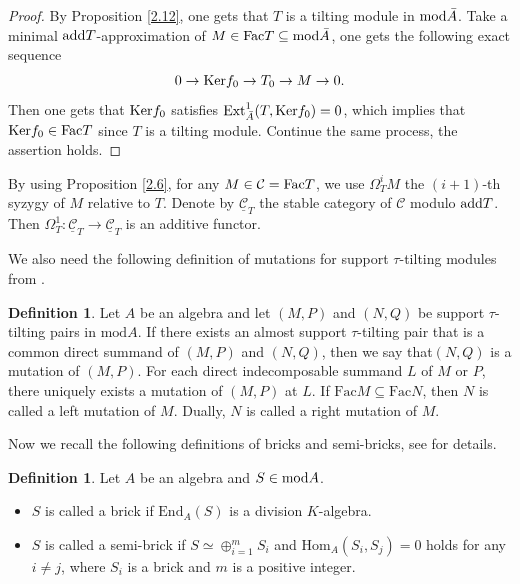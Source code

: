 \documentclass[a4paper]{amsart}
\theoremstyle{definition}
\newtheorem{defn}[thm]{Definition}
\theoremstyle{remark}
\numberwithin{equation}{section}
\begin{document}
\begin{proof} By Proposition \ref{2.12}, one gets that $T$ is a tilting module in ${\rm mod}\bar{A}$. Take a minimal ${\rm add}T$-approximation of $M \in {\rm Fac}T\subseteq {\rm mod}\bar{A}$, one gets the following exact sequence $$0\rightarrow {\rm Ker}f_0\rightarrow T_0\rightarrow M\rightarrow 0.$$  Then one gets that ${\rm Ker}f_0$ satisfies ${\rm Ext}_{\bar{A}}^1(T,{\rm Ker}f_0)=0$, which implies that ${\rm Ker}f_0\in {\rm Fac}T$ since $T$ is a tilting module. Continue the same process, the assertion holds.
\end{proof}
By using Proposition \ref{2.6}, for any $M\in\mathcal{C}={\rm Fac} T$, we use $\Omega^i_T M$ the $(i+1)$-th syzygy of $M$ relative to $T$. Denote by $\underline{\mathcal{C}}_T$ the stable category of $\mathcal{C}$ modulo ${\rm add}T$. Then $\Omega^1_T: \underline{\mathcal{C}}_T\longrightarrow \underline{\mathcal{C}}_T$ is an additive functor.

We also need the following definition of mutations for support $\tau$-tilting modules from \cite[Definition 2.19]{AIR}.

\begin{defn}\label{2.10} Let $A$ be an algebra and let $(M,P)$ and $(N,Q)$ be support $\tau$-tilting pairs in $\text{mod}A$. If there exists an almost support $\tau$-tilting pair that is a common direct summand of $(M,P)$ and $(N,Q)$, then we say that$(N,Q)$ is a mutation of $(M,P)$.  For each direct indecomposable summand $L$ of $M$ or $P$, there uniquely exists a mutation of $(M,P)$ at $L$.  If $\text{Fac}M \subseteq \text{Fac}N$, then $N$ is called a left mutation of $M$. Dually, $N$ is called a right mutation of $M$.
\end{defn}

 Now we recall the following definitions of bricks and semi-bricks, see \cite{As, Ri} for details.

\begin{defn}\label{2.7}  Let $A$ be an algebra and $S\in {\rm mod}A$.
\begin{itemize}
  \item
[(1)]  $S$ is called a brick if $\text{End}_A (S)$ is a division $K$-algebra.

  \item
[(2)] $S$ is called a semi-brick if $S\simeq \oplus_{i=1}^m S_i$ and $\text{Hom}_A (S_i, S_j) =0$ holds for any $i\neq j$, where $S_i$ is a brick and $m$ is a positive integer.
\end{itemize}
\end{defn}
\end{document}
